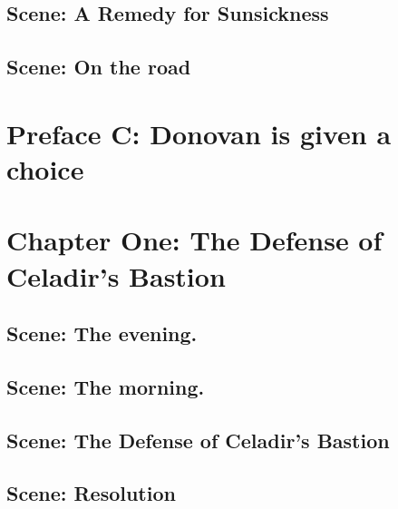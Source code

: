 \documentclass{report}
\begin{document}
  \subsection{Scene: A Remedy for Sunsickness}
  \subsection{Scene: On the road}

  \section{Preface C: Donovan is given a choice}\label{sec:prefaceC:DonovanIsGivenAChoice}


  \section{Chapter One: The Defense of Celadir's Bastion}\label{sec:chapterOne:TheDefenseOfCeladir'sBastion}
  \subsection{Scene: The evening.}\label{subsec:scene:TheEvening.}
  \subsection{Scene: The morning.}\label{subsec:scene:TheMorning.}
  \subsection{Scene: The Defense of Celadir's Bastion}\label{subsec:scene:TheDefenseOfCeladir'sBastion}
  \subsection{Scene: Resolution}\label{subsec:scene:Resolution}
\end{document}
